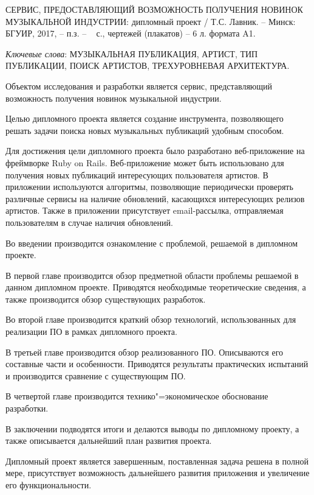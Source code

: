 \thispagestyle{empty}

\begin{center}
  \begin{minipage}{0.90\textwidth}
    СЕРВИС, ПРЕДОСТАВЛЯЮЩИЙ ВОЗМОЖНОСТЬ ПОЛУЧЕНИЯ НОВИНОК МУЗЫКАЛЬНОЙ ИНДУСТРИИ: дипломный проект / Т.С. Лавник. -- Минск: БГУИР, 2017, -- п.з. -- ~\pageref*{LastPage} с., чертежей (плакатов) -- 6 л. формата A1.
  \end{minipage}
\end{center}

\emph{Ключевые слова}: МУЗЫКАЛЬНАЯ ПУБЛИКАЦИЯ, АРТИСТ, ТИП ПУБЛИКАЦИИ, ПОИСК АРТИСТОВ, ТРЕХУРОВНЕВАЯ АРХИТЕКТУРА.

Объектом исследования и разработки является сервис, представляющий возможность получения новинок музыкальной индустрии.

Целью дипломного проекта является создание инструмента, позволяющего решать задачи поиска новых музыкальных публикаций удобным способом.

Для достижения цели дипломного проекта было разработано веб-приложение на фреймворке Ruby on Rails.
Веб-приложение может быть использовано для получения новых публикаций интересующих пользователя артистов.
В приложении используются алгоритмы, позволяющие периодически проверять различные сервисы на наличие обновлений, касающихся интересующих релизов артистов. Также в приложении присутствует email-рассылка, отправляемая пользователям в случае наличия обновлений.

Во введении производится ознакомление с проблемой, решаемой в дипломном проекте.

В первой главе производится обзор предметной области проблемы решаемой в данном дипломном проекте.
Приводятся необходимые теоретические сведения, а также производится обзор существующих разработок.

Во второй главе производится краткий обзор технологий, использованных для реализации ПО в рамках дипломного проекта.

В третьей главе производится обзор реализованного ПО.
Описываются его составные части и особенности.
Приводятся результаты практических испытаний и производится сравнение с существующим ПО.

В четвертой главе производится технико"=экономическое обоснование разработки.

В заключении подводятся итоги и делаются выводы по дипломному проекту, а также описывается дальнейший план развития проекта.

Дипломный проект является завершенным, поставленная задача решена в полной мере, присутствует возможность дальнейшего развития приложения и увеличение его функциональности.

\clearpage
